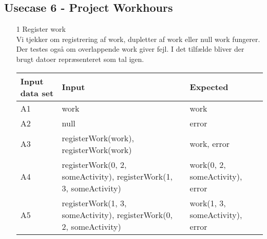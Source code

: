 \documentclass[a4paper,12pt]{article}
\begin{document}
\subsection{Usecase 6 - Project Workhours}
\begin{enumerate}
	\item[1] Register work \\
		Vi tjekker om registrering af work, dupletter af work eller null work fungerer. Der testes også om overlappende work giver fejl. I det tilfælde bliver der brugt datoer repræsenteret som tal igen.
			\begin{center}
			\begin{tabular}{|l|l|l|}
				\hline
				Input data set & Input & Expected \\
				\hline
				A1 & work & work \\
				A2 & null & error \\
				A3 & registerWork(work), registerWork(work) & work, error \\
				A4 & registerWork(0, 2, someActivity), registerWork(1, 3, someActivity) & work(0, 2, someActivity), error \\
				A5 & registerWork(1, 3, someActivity), registerWork(0, 2, someActivity) & work(1, 3, someActivity), error \\
				\hline
			\end{tabular}
			\end{center}
\end{enumerate}
\end{document}
